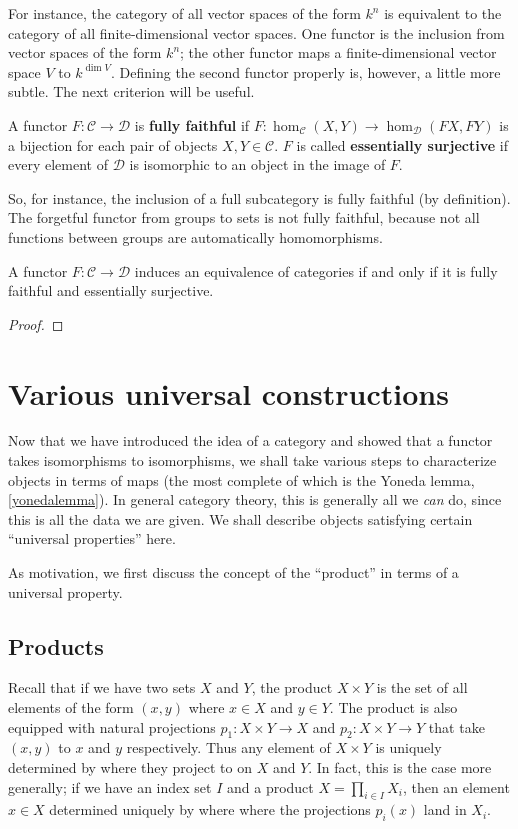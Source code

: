 For instance, the category of all vector spaces of the form $k^n$ is equivalent
to the category of all finite-dimensional vector spaces. 
One functor is the inclusion from vector spaces of the form $k^n$; the other
functor maps a finite-dimensional vector space $V$ to $k^{\dim V}$. Defining
the second functor properly is, however, a little more subtle. 
The next criterion will be useful.

\begin{definition} 
A functor $F: \mathcal{C} \to \mathcal{D}$ is \textbf{fully faithful} if $F:
\hom_{\mathcal{C}}(X, Y) \to \hom_{\mathcal{D}}(FX, FY)$ is a bijection for each pair of objects $X, Y \in
\mathcal{C}$.
$F$ is called \textbf{essentially surjective} if every element of $\mathcal{D}$
is isomorphic to an object in the image of $F$. 
\end{definition} 

So, for instance, the inclusion of a full subcategory is fully faithful (by
definition). The forgetful functor from groups to sets is not fully faithful,
because not all functions between groups are automatically homomorphisms. 


\begin{proposition} 
A functor $F: \mathcal{C} \to \mathcal{D}$ induces an equivalence of categories
if and only if it is fully faithful and essentially surjective.
\end{proposition} 
\begin{proof} 
\end{proof} 

\section{Various universal constructions}

Now that we have introduced the idea of a category and showed that a functor
takes isomorphisms to isomorphisms, we shall take various steps to characterize objects in terms of
maps (the most complete of which is the Yoneda lemma, \cref{yonedalemma}). In
general category
theory, this is generally all we \emph{can} do, since this is all the data we
are given.
We shall describe objects satisfying certain ``universal properties'' here.


As motivation, we first discuss the concept of the ``product'' in terms of a
universal property.

\subsection{Products}
Recall that if we have two sets $X$ and $Y$, the product $X\times Y$ is the set
of all elements of the form $(x,y)$ where $x\in X$ and $y\in Y$. The product is
also equipped with natural projections $p_1: X \times Y \to X$ and $p_2: X
\times Y \to Y$ that take $(x,y)$ to $x$
and $y$ respectively. Thus any element of $X\times Y$ is uniquely determined by
where they project to on $X$ and $Y$. In fact, this is the case more generally; if
we have an index set $I$ and a product $X=\prod_{i\in I} X_i$, then an element
$x\in X$ determined uniquely by where where the projections $p_i(x)$ land in
$X_i$. 

